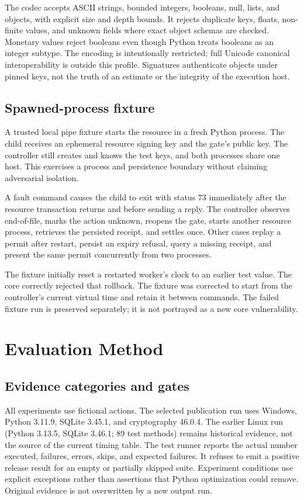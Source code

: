 \documentclass[10pt,journal,a4paper]{IEEEtran}
\begin{document}
The codec accepts ASCII strings, bounded integers, booleans, null, lists, and objects, with explicit size and depth bounds. It rejects duplicate keys, floats, non-finite values, and unknown fields where exact object schemas are checked. Monetary values reject booleans even though Python treats booleans as an integer subtype. The encoding is intentionally restricted; full Unicode canonical interoperability is outside this profile. Signatures authenticate objects under pinned keys, not the truth of an estimate or the integrity of the execution host.

\subsection{Spawned-process fixture}
A trusted local pipe fixture starts the resource in a fresh Python process. The child receives an ephemeral resource signing key and the gate's public key. The controller still creates and knows the test keys, and both processes share one host. This exercises a process and persistence boundary without claiming adversarial isolation.

A fault command causes the child to exit with status 73 immediately after the resource transaction returns and before sending a reply. The controller observes end-of-file, marks the action unknown, reopens the gate, starts another resource process, retrieves the persisted receipt, and settles once. Other cases replay a permit after restart, persist an expiry refusal, query a missing receipt, and present the same permit concurrently from two processes.

The fixture initially reset a restarted worker's clock to an earlier test value. The core correctly rejected that rollback. The fixture was corrected to start from the controller's current virtual time and retain it between commands. The failed fixture run is preserved separately; it is not portrayed as a new core vulnerability.

\section{Evaluation Method}
\subsection{Evidence categories and gates}
All experiments use fictional actions. The selected publication run uses Windows, Python 3.11.9, SQLite 3.45.1, and cryptography 46.0.4. The earlier Linux run (Python 3.13.5, SQLite 3.46.1; 89 test methods) remains historical evidence, not the source of the current timing table. The test runner reports the actual number executed, failures, errors, skips, and expected failures. It refuses to emit a positive release result for an empty or partially skipped suite. Experiment conditions use explicit exceptions rather than assertions that Python optimization could remove. Original evidence is not overwritten by a new output run.
\end{document}
